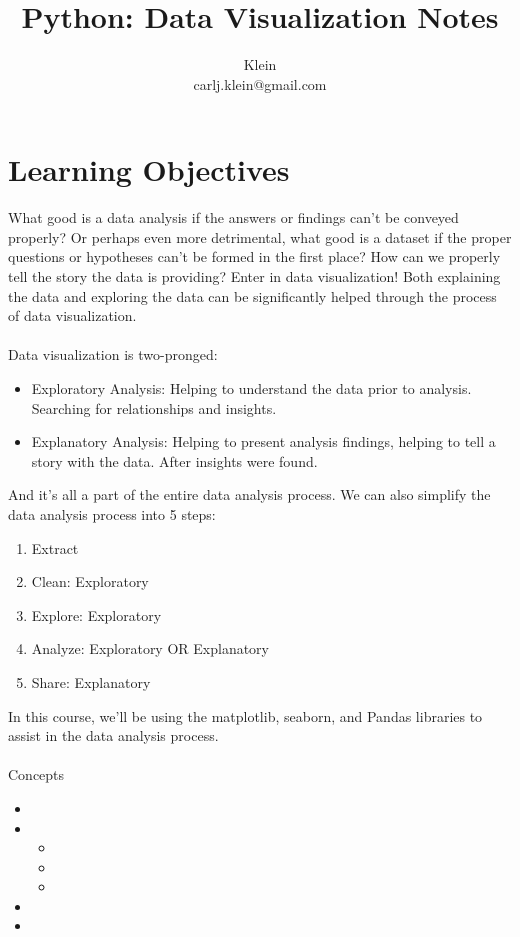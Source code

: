 \documentclass{article}
\begin{document}
	\title{Python: Data Visualization Notes}
	\author{Klein \\ carlj.klein@gmail.com}
	\date{}
	\maketitle
	
\section{Learning Objectives}
What good is a data analysis if the answers or findings can't be conveyed properly? Or perhaps even more detrimental, what good is a dataset if the proper questions or hypotheses can't be formed in the first place? How can we properly tell the story the data is providing? Enter in data visualization! Both explaining the data and exploring the data can be significantly helped through the process of data visualization.
\\\\
Data visualization is two-pronged:
\begin{itemize}
	\item Exploratory Analysis: Helping to understand the data prior to analysis. Searching for relationships and insights.
	\item Explanatory Analysis: Helping to present analysis findings, helping to tell a story with the data. After insights were found.
\end{itemize}


And it's all a part of the entire data analysis process. We can also simplify the data analysis process into 5 steps:
\begin{enumerate}
	\item Extract
	\item Clean: Exploratory
	\item Explore: Exploratory
	\item Analyze: Exploratory OR Explanatory
	\item Share: Explanatory
\end{enumerate}

In this course, we'll be using the matplotlib, seaborn, and Pandas libraries to assist in the data analysis process.
\\\\

Concepts
\begin{itemize}
	\item {}
	\item {}
		\begin{itemize}
			\item {}
			\item {}
			\item {}
		\end{itemize}
	\item {}
	\item {}
\end{itemize}
	
\end{document}
